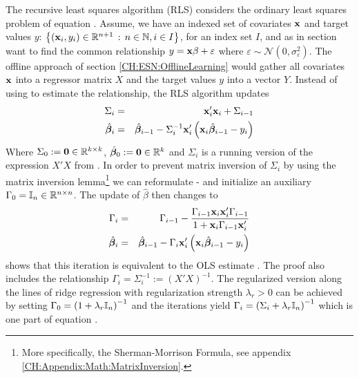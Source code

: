 The recursive least squares algorithm (RLS) considers the ordinary least squares problem of equation . Assume, we have an indexed set of covariates ${\bf x}$ and target values $y$: $\left\{({\bf x}_i, y_i) \in \mathbb{R}^{n+1} \,:\, n \in \mathbb{N}, i \in I\right\}$, for an index set $I$, and as in section  want to find the common relationship $y ={\bf x}\beta + \varepsilon$ where $\varepsilon \sim \mathcal{N}(0, \sigma_{\varepsilon}^2)$. The offline approach of section \ref{CH:ESN:OfflineLearning} would gather all covariates ${\bf x}$ into a regressor matrix $X$ and the target values $y$ into a vector $Y$. Instead of using  to estimate the relationship, the RLS algorithm updates
\begin{eqnarray}
    \Sigma_i & = & {\bf x}_i' {\bf x}_i + \Sigma_{i-1} \label{EQ:RLS11}\\
    \hat {{{\bm \beta}}}_i & = & \hat {{{\bm \beta}}}_{i-1} - \Sigma_i^{-1} {\bf x}_i' \left({\bf x}_i\hat{{{\bm \beta}}}_{i-1} - y_i\right) \label{EQ:RLS12}
\end{eqnarray}
Where $\Sigma_0 := {\bf 0} \in \mathbb{R}^{k\times k}$, $\hat{{{\bm \beta}}}_0 := {\bf 0} \in \mathbb{R}^{k}$ and $\Sigma_i$ is a running version of the expression $X'X$ from . 
In order to prevent matrix inversion of $\Sigma_i$ by using the matrix inversion lemma\footnote{More specifically, the Sherman-Morrison Formula, see appendix \ref{CH:Appendix:Math:MatrixInversion}.} we can reformulate - and initialize an auxiliary $\Gamma_0 = \mathbb{I}_{n} \in \mathbb{R}^{n \times n}$. The update of $\hat \beta$ then changes to
\begin{eqnarray}
    \Gamma_i & = & \Gamma_{i-1} - \frac{\Gamma_{i-1} {\bf x}_i {\bf x}_i' \Gamma_{i-1}}{1 + {\bf x}_i\Gamma_{i-1}{\bf x}_i'} \label{EQ:RLS21} \\
    \hat{{{\bm \beta}}}_i & = & \hat{{{\bm \beta}}}_{i-1} - \Gamma_i {\bf x}_i' \left({\bf x}_i\hat{{{\bm \beta}}}_{i-1} - y_i\right) \label{EQ:RLS22}
\end{eqnarray}
\cite{Kushner2003RLS} shows that this iteration is equivalent to the OLS estimate . The proof also includes the relationship $\Gamma_i = \Sigma_i^{-1} := \left(X'X\right)^{-1}$. 
The regularized version along the lines of ridge regression  with regularization strength $\lambda_r > 0$ can be achieved by setting $\Gamma_0 = \left(1 + \lambda_r \mathbb{I}_{n}\right)^{-1}$ and the iterations yield $\Gamma_i = \left(\Sigma_i + \lambda_r \mathbb{I}_{n}\right)^{-1}$ which is one part of equation .

